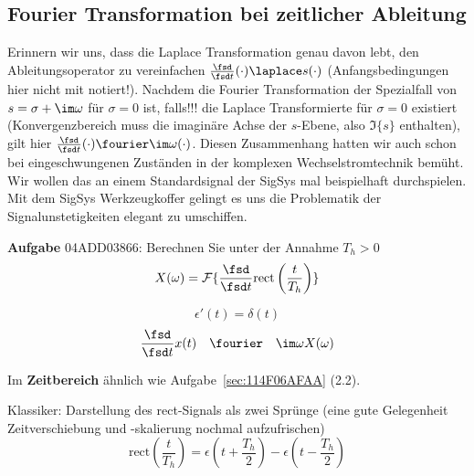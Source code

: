 \subsection{Fourier Transformation bei zeitlicher Ableitung}
\label{sec:04ADD03866}
\begin{Ziel}
Erinnern wir uns, dass die Laplace Transformation genau davon lebt, den
Ableitungsoperator zu vereinfachen $\frac{\fsd}{\fsd t}(\cdot) \laplace s(\cdot)$
(Anfangsbedingungen hier nicht mit notiert!).
Nachdem  die Fourier Transformation der Spezialfall von $s=\sigma+\im\omega$ für
$\sigma=0$ ist, falls!!! die Laplace Transformierte für $\sigma=0$ existiert
(Konvergenzbereich muss die imaginäre Achse der $s$-Ebene, also $\Im\{s\}$ enthalten),
gilt hier $\frac{\fsd}{\fsd t}(\cdot) \fourier \im\omega(\cdot)$. Diesen Zusammenhang
hatten wir auch schon bei eingeschwungenen Zuständen in der komplexen Wechselstromtechnik
bemüht.
Wir wollen das an einem Standardsignal der SigSys mal beispielhaft
durchspielen. Mit dem SigSys Werkzeugkoffer gelingt es uns die Problematik der
Signalunstetigkeiten elegant zu umschiffen.
\end{Ziel}
\textbf{Aufgabe} {\tiny 04ADD03866}: Berechnen Sie unter der Annahme $T_h>0$
\begin{equation}
  X(\omega) = \mathcal{F}\{\frac{\fsd}{\fsd t} \mathrm{rect}\left(\frac{t}{T_h}\right)\}
\end{equation}
\begin{Werkzeug}
\begin{equation}
  \epsilon'(t) = \delta(t)
\end{equation}
\begin{equation}
\frac{\fsd}{\fsd t} x(t) \quad\fourier\quad \im\omega X(\omega)
\end{equation}
\end{Werkzeug}
\begin{Ansatz}
Im \textbf{Zeitbereich} ähnlich wie Aufgabe~\ref{sec:114F06AFAA} (2.2).

Klassiker: Darstellung des rect-Signals als zwei Sprünge (eine gute Gelegenheit
Zeitverschiebung und -skalierung nochmal aufzufrischen)
\begin{equation}
  \mathrm{rect}\left(\frac{t}{T_h}\right) = \epsilon(t+\frac{T_h}{2}) - \epsilon(t-\frac{T_h}{2})
\end{equation}
\end{Ansatz}

